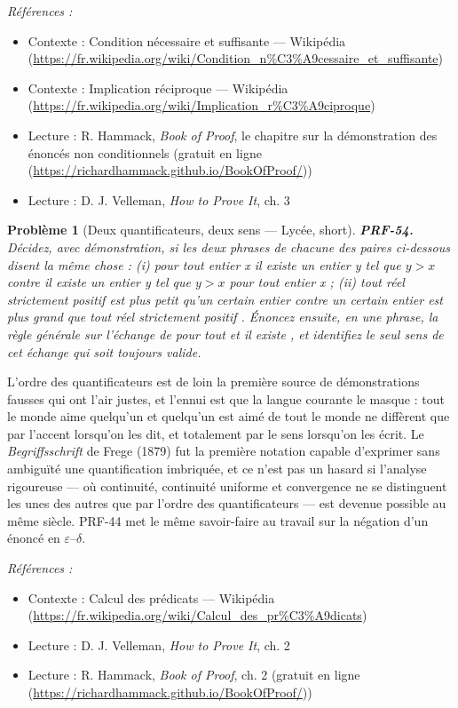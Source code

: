 \documentclass[11pt]{article}
\newtheorem{problem}{Problème}
\newenvironment{refs}{\par\small\noindent\emph{Références :}\begin{itemize}\setlength\itemsep{0pt}}{\end{itemize}\normalsize}
\begin{document}
\begin{refs}
\item Contexte : Condition nécessaire et suffisante --- Wikipédia (\url{https://fr.wikipedia.org/wiki/Condition_n%C3%A9cessaire_et_suffisante})
\item Contexte : Implication réciproque --- Wikipédia (\url{https://fr.wikipedia.org/wiki/Implication_r%C3%A9ciproque})
\item Lecture : R. Hammack, \textit{Book of Proof}, le chapitre sur la démonstration des énoncés non conditionnels (gratuit en ligne (\url{https://richardhammack.github.io/BookOfProof/}))
\item Lecture : D. J. Velleman, \textit{How to Prove It}, ch. 3
\end{refs}

\bigskip

\begin{problem}[{Deux quantificateurs, deux sens --- Lycée, short}]
\textbf{PRF-54.} Décidez, avec démonstration, si les deux phrases de
chacune des paires ci-dessous disent la même chose : (i) \og{} pour tout entier x il existe un
entier y tel que $ y > x $ \fg{} contre \og{} il existe un entier y tel que $ y > x $ pour tout
entier x \fg{} ; (ii) \og{} tout réel strictement positif est plus petit qu'un certain entier \fg{}
contre \og{} un certain entier est plus grand que tout réel strictement positif \fg{}. Énoncez
ensuite, en une phrase, la règle générale sur l'échange de \og{} pour tout \fg{} et \og{} il existe \fg{}, et
identifiez le seul sens de cet échange qui soit toujours valide.
\end{problem}

\noindent L'ordre des quantificateurs est de loin la première source de
démonstrations fausses qui ont l'air justes, et l'ennui est que la langue courante le
masque : \og{} tout le monde aime quelqu'un \fg{} et \og{} quelqu'un est aimé de tout le monde \fg{} ne
diffèrent que par l'accent lorsqu'on les dit, et totalement par le sens lorsqu'on les écrit.
Le \textit{Begriffsschrift} de Frege (1879) fut la première notation capable d'exprimer sans
ambiguïté une quantification imbriquée, et ce n'est pas un hasard si l'analyse rigoureuse ---
où continuité, continuité uniforme et convergence ne se distinguent les unes des autres que
par l'ordre des quantificateurs --- est devenue possible au même siècle. PRF-44 met le même
savoir-faire au travail sur la négation d'un énoncé en $\varepsilon$--$\delta$.

\begin{refs}
\item Contexte : Calcul des prédicats --- Wikipédia (\url{https://fr.wikipedia.org/wiki/Calcul_des_pr%C3%A9dicats})
\item Lecture : D. J. Velleman, \textit{How to Prove It}, ch. 2
\item Lecture : R. Hammack, \textit{Book of Proof}, ch. 2 (gratuit en ligne (\url{https://richardhammack.github.io/BookOfProof/}))
\end{refs}
\end{document}
